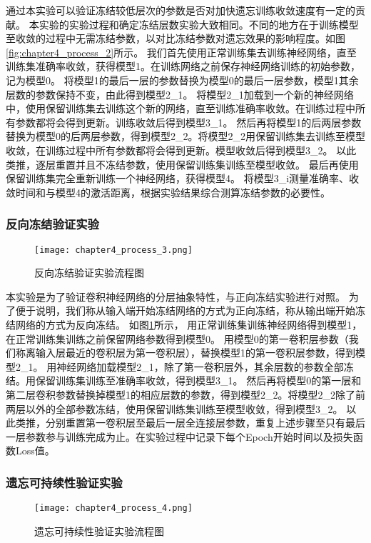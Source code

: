 通过本实验可以验证冻结较低层次的参数是否对加快遗忘训练收敛速度有一定的贡献。
本实验的实验过程和确定冻结层数实验大致相同。不同的地方在于训练模型至收敛的过程中无需冻结参数，以对比冻结参数对遗忘效果的影响程度。如图\ref{fig:chapter4_process_2}所示。
我们首先使用正常训练集去训练神经网络，直至训练集准确率收敛，获得模型1。在训练网络之前保存神经网络训练的初始参数，记为模型0。
将模型1的最后一层的参数替换为模型0的最后一层参数，模型1其余层数的参数保持不变，由此得到模型2\_1。
将模型2\_1加载到一个新的神经网络中，使用保留训练集去训练这个新的网络，直至训练准确率收敛。在训练过程中所有参数都将会得到更新。训练收敛后得到模型3\_1。
然后再将模型1的后两层参数替换为模型0的后两层参数，得到模型2\_2。将模型2\_2用保留训练集去训练至模型收敛，在训练过程中所有参数都将会得到更新。模型收敛后得到模型3\_2。
以此类推，逐层重置并且不冻结参数，使用保留训练集训练至模型收敛。
最后再使用保留训练集完全重新训练一个神经网络，获得模型4。
将模型3\_i测量准确率、收敛时间和与模型4的激活距离，根据实验结果综合测算冻结参数的必要性。

\subsubsection{反向冻结验证实验}
\begin{figure}
    \centering
    \texttt{[image: chapter4\_process\_3.png]}
    \caption{反向冻结验证实验流程图}
    \label{fig:chapter4_process_3}
\end{figure}

本实验是为了验证卷积神经网络的分层抽象特性，与正向冻结实验进行对照。
为了便于说明，我们称从输入端开始冻结网络的方式为正向冻结，称从输出端开始冻结网络的方式为反向冻结。
如图\ref{fig:chapter4_process_3}所示，
用正常训练集训练神经网络得到模型1，在正常训练集训练之前保留网络参数得到模型0。
用模型0的第一卷积层参数（我们称离输入层最近的卷积层为第一卷积层），替换模型1的第一卷积层参数，得到模型2\_1。
用神经网络加载模型2\_1，除了第一卷积层外，其余层数的参数全部冻结。用保留训练集训练至准确率收敛，得到模型3\_1。
然后再将模型0的第一层和第二层卷积参数替换掉模型1的相应层数的参数，得到模型2\_2。将模型2\_2除了前两层以外的全部参数冻结，使用保留训练集训练至模型收敛，得到模型3\_2。
以此类推，分别重置第一卷积层至最后一层全连接层参数，重复上述步骤至只有最后一层参数参与训练完成为止。在实验过程中记录下每个Epoch开始时间以及损失函数Loss值。

\subsubsection{遗忘可持续性验证实验}
\begin{figure}
    \centering
    \texttt{[image: chapter4\_process\_4.png]}
    \caption{遗忘可持续性验证实验流程图}
    \label{fig:chapter4_process_4}
\end{figure}


